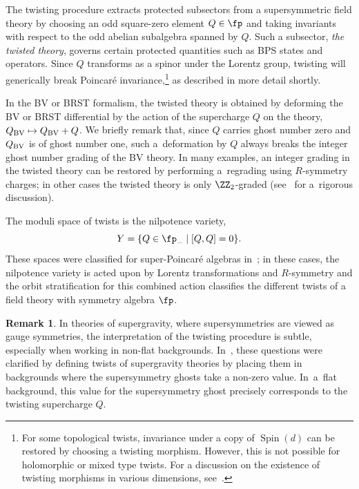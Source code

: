 \documentclass[pdftex]{sigma}
\numberwithin{equation}{section}
\theoremstyle{definition}
\newtheorem{Remark}[Theorem]{Remark}
\DeclareMathOperator{\Spin}{Spin}
\begin{document}
The twisting procedure extracts protected subsectors from a supersymmetric field theory by choosing an odd square-zero element $Q \in \fp$ and taking invariants with respect to the odd abelian subalgebra spanned by $Q$. Such a subsector, \emph{the twisted theory}, governs certain protected quantities such as BPS states and operators. Since $Q$ transforms as a spinor under the Lorentz group, twisting will generically break Poincar\'e invariance,\footnote{For some topological twists, invariance under a copy of $\Spin(d)$ can be restored by choosing a twisting morphism. However, this is not possible for holomorphic or mixed type twists. For a discussion on the existence of twisting morphisms in various dimensions, see~\cite{ElliottSafronov}.} as described in more detail shortly.

In the BV or BRST formalism, the twisted theory is obtained by deforming the BV or BRST differential by the action of the supercharge $Q$ on the theory,
$
 Q_{\rm BV} \mapsto Q_{\rm BV} + Q$.
We briefly remark that, since $Q$ carries ghost number zero and $Q_{\rm BV}$ is of ghost number one, such a~deformation by $Q$ always breaks the integer ghost number grading of the BV theory. In many examples, an integer grading in the twisted theory can be restored by performing a~regrading using $R$-symmetry charges; in other cases the twisted theory is only $\ZZ_2$-graded (see~\cite{CostelloHol} for a~rigorous discussion).

The moduli space of twists is the nilpotence variety,
\[
 Y = \{ Q \in \fp_- \mid [Q,Q] = 0 \}.
\]
These spaces were classified for super-Poincar\'e algebras in~\cite{NV, ElliottSafronov}; in these cases, the nilpotence variety is acted upon by Lorentz transformations and $R$-symmetry and the orbit stratification for this combined action classifies the different twists of a field theory with symmetry algebra $\fp$.

\begin{Remark}
 In theories of supergravity, where supersymmetries are viewed as gauge symmetries, the interpretation of the twisting procedure is subtle, especially when working in non-flat backgrounds. In~\cite{CostelloLi}, these questions were clarified by defining twists of supergravity theories by placing them in backgrounds where the supersymmetry ghosts take a non-zero value. In~a~flat background, this value for the supersymmetry ghost precisely corresponds to the twisting supercharge $Q$.
\end{Remark}
\end{document}
